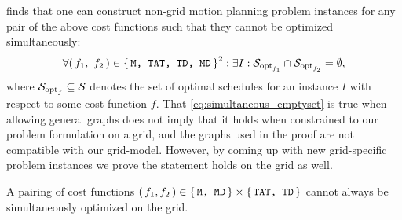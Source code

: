 \cite{corr/YuL15c} finds that one can construct non-grid motion planning problem instances for any pair of the above cost functions such that they cannot be optimized simultaneously:
\begin{align}\label{eq:simultaneous_emptyset}
	\forall (\, f_1,\ f_2 \,) \in \set{\texttt{M, TAT, TD, MD}}^2 : \exists I : \mathcal{S}_{\text{opt}_{f_1}} \cap \mathcal{S}_{\text{opt}_{f_2}} = \emptyset,
\end{align}
where \(\mathcal{S}_{\text{opt}_f} \subseteq \mathcal{S}\) denotes the set of optimal schedules for an instance \(I\) with respect to some cost function \(f\).
That \cref{eq:simultaneous_emptyset} is true when allowing general graphs does not imply that it holds when constrained to our problem formulation on a grid, and the graphs used in the proof are not compatible with our grid-model.
However, by coming up with new grid-specific problem instances we prove the statement holds on the grid as well.

\begin{lemma}\label{lemma:simultaneous_pairings_1}
	A pairing of cost functions \((\, f_1, f_2 \,) \in \set{\texttt{M, MD}} \times \set{\texttt{TAT, TD}}\) cannot always be simultaneously optimized on the grid.
\end{lemma}

